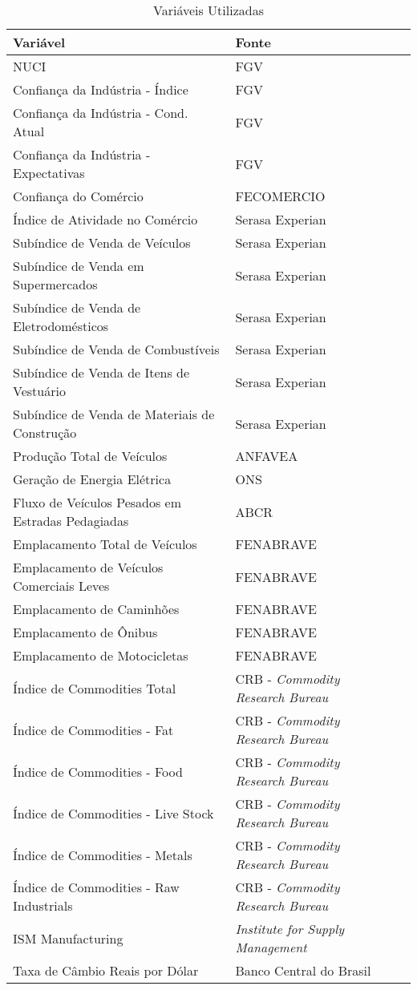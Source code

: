 \documentclass[
	article,			%
	11pt,				%
	oneside,			%
	a4paper,			%
	english,			%
	brazil,				%
	]{abntex2}
\begin{document}
\begin{appendices}
\begin{table}[H]
		\centering
			\begin{tabular}{lll}
			\hline
			Variável & Fonte \\ \hline
			NUCI & FGV \\
			Confiança da Indústria - Índice & FGV \\
			Confiança da Indústria - Cond. Atual & FGV \\
			Confiança da Indústria - Expectativas & FGV \\
			Confiança do Comércio & FECOMERCIO \\
			Índice de Atividade no Comércio & Serasa Experian \\
			Subíndice de Venda de Veículos & Serasa Experian \\
			Subíndice de Venda em Supermercados & Serasa Experian \\
			Subíndice de Venda de Eletrodomésticos & Serasa Experian \\
			Subíndice de Venda de Combustíveis & Serasa Experian \\
			Subíndice de Venda de Itens de Vestuário & Serasa Experian \\
			Subíndice de Venda de Materiais de Construção & Serasa Experian \\
			Produção Total de Veículos & ANFAVEA \\
			Geração de Energia Elétrica & ONS \\
			Fluxo de Veículos Pesados em Estradas Pedagiadas & ABCR \\
			Emplacamento Total de Veículos & FENABRAVE \\
			Emplacamento de Veículos Comerciais Leves & FENABRAVE \\
			Emplacamento de Caminhões & FENABRAVE \\
			Emplacamento de Ônibus & FENABRAVE \\
			Emplacamento de Motocicletas & FENABRAVE \\
			Índice de Commodities Total & CRB - \textsl{Commodity Research Bureau} \\
			Índice de Commodities - Fat & CRB - \textsl{Commodity Research Bureau} \\
			Índice de Commodities - Food & CRB - \textsl{Commodity Research Bureau} \\
			Índice de Commodities - Live Stock & CRB - \textsl{Commodity Research Bureau} \\
			Índice de Commodities - Metals & CRB - \textsl{Commodity Research Bureau} \\
			Índice de Commodities - Raw Industrials & CRB - \textsl{Commodity Research Bureau} \\
			ISM Manufacturing & \textsl{Institute for Supply Management} \\
			Taxa de Câmbio Reais por Dólar & Banco Central do Brasil \\ \hline
			\end{tabular}
		\caption{Variáveis Utilizadas}
		\label{tab:VariáveisCandidatas}
	\end{table}	
	

\end{appendices}
\end{document}
